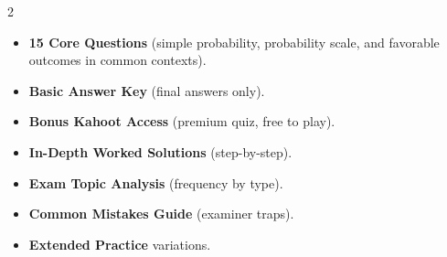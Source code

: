 \documentclass[11pt,a4paper]{article}
\newcommand{\FullReleaseDate}{April 30, 2026}
\begin{document}
\vspace{8pt}

\begin{multicols}{2}
  \begin{tcolorbox}[card, title=\sffamily\bfseries\textcolor{white}{\faHandPointDown\ TODAY (Simplified Version)}, colbacktitle=mainblue, boxed title style={sharp corners, boxrule=0pt}]
    \begin{itemize}[leftmargin=1.2em, itemsep=2pt]
      \item \small \textbf{15 Core Questions} (simple probability, probability scale, and favorable outcomes in common contexts).
      \item \small \textbf{Basic Answer Key} (final answers only).
      \item \small \textbf{Bonus Kahoot Access} (premium quiz, free to play).
    \end{itemize}
  \end{tcolorbox}

  \columnbreak

  \begin{tcolorbox}[card, title=\sffamily\bfseries\textcolor{white}{\faRocket\ ON \FullReleaseDate\ (Full Upgrade)}, colbacktitle=mainblue, boxed title style={sharp corners, boxrule=0pt}]
    \begin{itemize}[leftmargin=1.2em, itemsep=2pt]
      \item \small \textbf{In-Depth Worked Solutions} (step-by-step).
      \item \small \textbf{Exam Topic Analysis} (frequency by type).
      \item \small \textbf{Common Mistakes Guide} (examiner traps).
      \item \small \textbf{Extended Practice} variations.
    \end{itemize}
  \end{tcolorbox}
\end{multicols}
\end{document}
